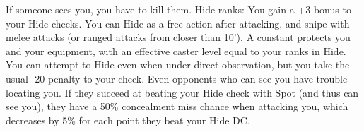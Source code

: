 \skillfeat
{If someone sees you, you have to kill them.}
{Hide ranks:}
{You gain a +3 bonus to your Hide checks.}
{You can Hide as a free action after attacking, and snipe with melee attacks (or ranged attacks from closer than 10').}
{A constant  protects you and your equipment, with an effective caster level equal to your ranks in Hide.}
{You can attempt to Hide even when under direct observation, but you take the usual -20 penalty to your check.}
{Even opponents who can see you have trouble locating you. If they succeed at beating your Hide check with Spot (and thus can see you), they have a 50\% concealment miss chance when attacking you, which decreases by 5\% for each point they beat your Hide DC.}